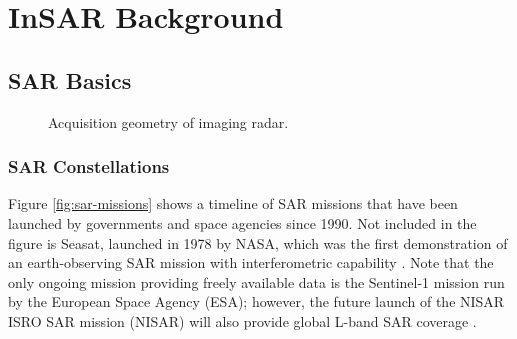 
\chapter{InSAR Background}
\label{CHAP:3}


\section{SAR Basics}
\label{CHAP:3-sar}









\begin{figure}[hbt!]
	\centering
	\caption{Acquisition geometry of imaging radar.
	}
	\label{fig:ch3-sar-geometry}
\end{figure}



\subsection{SAR Constellations}


Figure \ref{fig:sar-missions} shows a timeline of SAR missions that have been launched by governments and space agencies since 1990. Not included in the figure is Seasat, launched in 1978 by NASA, which was the first demonstration of an earth-observing SAR mission with interferometric capability \cite{Born1979SeasatMissionOverview, Gabriel1989MappingSmallElevation}. Note that the only ongoing mission providing freely available data is the Sentinel-1 mission run by the European Space Agency (ESA); however, the future launch of the NISAR ISRO SAR mission (NISAR) will also provide global L-band SAR coverage \cite{Rosen2015NasaIsroSar}.


